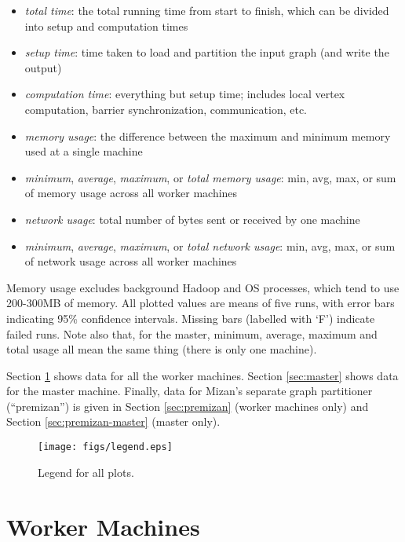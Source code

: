 \documentclass{article}
\newcommand{\bline}[1][1]{\vspace{#1\baselineskip}}
\begin{document}
\begin{itemize}
  \setlength{\itemsep}{-3pt}
\item \textit{total time}: the total running time from start to finish, which can be divided into setup and computation times
\item \textit{setup time}: time taken to load and partition the input graph (and write the output)
\item \textit{computation time}: everything but setup time; includes local vertex computation, barrier synchronization, communication, etc.
\bline[0.5]
\item \textit{memory usage}: the difference between the maximum and minimum memory used at a single machine
\item \textit{minimum}, \textit{average}, \textit{maximum}, or \textit{total memory usage}: min, avg, max, or sum of memory usage across all worker machines
\bline[0.5]
\item \textit{network usage}: total number of bytes sent or received by one machine
\item \textit{minimum}, \textit{average}, \textit{maximum}, or \textit{total network usage}: min, avg, max, or sum of network usage across all worker machines
\end{itemize}

\noindent Memory usage excludes background Hadoop and OS processes, which tend to use 200-300MB of memory. All plotted values are means of five runs, with error bars indicating 95\% confidence intervals. Missing bars (labelled with `F') indicate failed runs. Note also that, for the master, minimum, average, maximum and total usage all mean the same thing (there is only one machine).

\bline
Section \ref{sec:workers} shows data for all the worker machines. Section \ref{sec:master} shows data for the master machine. Finally, data for Mizan's separate graph partitioner (``premizan'') is given in Section \ref{sec:premizan} (worker machines only) and Section \ref{sec:premizan-master} (master only).

\bline[0.5]
\begin{figure}[ht]
  \centering
  \texttt{[image: figs/legend.eps]}
  \caption{Legend for all plots.}
  \label{fig:legend}
\end{figure}


\pagebreak
\section{Worker Machines}
\label{sec:workers}
\end{document}
